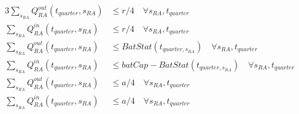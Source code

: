 \begin{alignat}{3}
	\sum_{s_{RA}} Q^{out}_{RA}(t_{quarter}, s_{RA}) & \leq r/4 \quad \forall s_{RA}, t_{quarter} \label{eq:RA_Q_out_r}                                    \\
	\sum_{s_{RA}} Q^{in}_{RA}(t_{quarter}, s_{RA})  & \leq r/4 \quad \forall s_{RA}, t_{quarter} \label{eq:RA_Q_in_r}                                     \\
	\sum_{s_{RA}} Q^{out}_{RA}(t_{quarter}, s_{RA}) & \leq BatStat(t_{quarter, s_{RA}}) \quad \forall s_{RA}, t_{quarter} \label{eq:RA_Q_out_Bat}         \\
	\sum_{s_{RA}} Q^{in}_{RA}(t_{quarter}, s_{RA})  & \leq batCap - BatStat(t_{quarter, s_{RA}}) \quad \forall s_{RA}, t_{quarter} \label{eq:RA_Q_in_Bat} \\
	\sum_{s_{RA}} Q^{out}_{RA}(t_{quarter}, s_{RA}) & \leq a/4 \quad \forall s_{RA}, t_{quarter} \label{eq:RA_Q_out_a}                                    \\
	\sum_{s_{RA}} Q^{in}_{RA}(t_{quarter}, s_{RA})  & \leq a/4 \quad \forall s_{RA}, t_{quarter} \label{eq:RA_Q_in_a}
\end{alignat}

